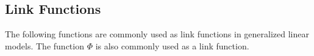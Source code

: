 \begin{description}
\begin{description}
\begin{description}
\begin{description}
\begin{description}
\begin{description}
\begin{description}
\begin{description}
\begin{description}
\begin{description}
\begin{description}
\begin{description}
\begin{description}
\begin{description}
\begin{description}
\begin{description}
\begin{description}
\begin{description}
\begin{description}
\begin{description}   %



\section{Link Functions}

The following functions are commonly used as link functions in generalized linear models.  The function $\Phi$ is also commonly used as a link function.


\end{description}
\end{description}
\end{description}
\end{description}
\end{description}
\end{description}
\end{description}
\end{description}
\end{description}
\end{description}
\end{description}
\end{description}
\end{description}
\end{description}
\end{description}
\end{description}
\end{description}
\end{description}
\end{description}
\end{description}
